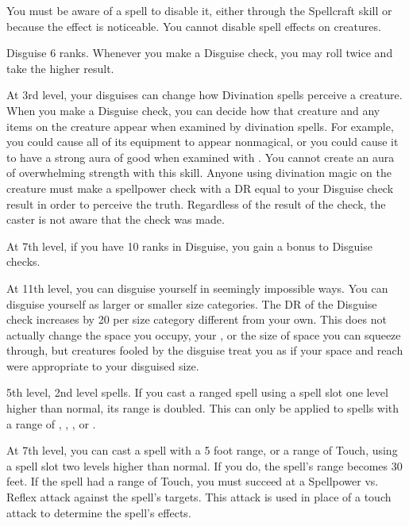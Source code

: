     You must be aware of a spell to disable it, either through the Spellcraft skill or because the effect is noticeable.
    You cannot disable spell effects on creatures.

    \featpre Disguise 6 ranks.
    \featben Whenever you make a Disguise check, you may roll twice and take the higher result.

    At 3rd level, your disguises can change how Divination spells perceive a creature.
    When you make a Disguise check, you can decide how that creature and any items on the creature appear when examined by divination spells.
    For example, you could cause all of its equipment to appear nonmagical, or you could cause it to have a strong aura of good when examined with .
    You cannot create an aura of overwhelming strength with this skill.
    Anyone using divination magic on the creature must make a spellpower check with a DR equal to your Disguise check result in order to perceive the truth.
    Regardless of the result of the check, the caster is not aware that the check was made.
    \magical

    At 7th level, if you have 10 ranks in Disguise, you gain a  bonus to Disguise checks.

    At 11th level, you can disguise yourself in seemingly impossible ways.
    You can disguise yourself as larger or smaller size categories.
    The DR of the Disguise check increases by 20 per size category different from your own.
    This does not actually change the space you occupy, your , or the size of space you can squeeze through, but creatures fooled by the disguise treat you as if your space and reach were appropriate to your disguised size.
    \magical

    \featpre 5th level, 2nd level spells.
    \featben If you cast a ranged spell using a spell slot one level higher than normal, its range is doubled.
    This can only be applied to spells with a range of \rngclose, \rngmed, \rnglong, or \rngext.

    At 7th level, you can cast a spell with a 5 foot range, or a range of Touch, using a spell slot two levels higher than normal.
    If you do, the spell's range becomes 30 feet.
    If the spell had a range of Touch, you must succeed at a Spellpower vs. Reflex attack against the spell's targets.
    This attack is used in place of a touch attack to determine the spell's effects.


